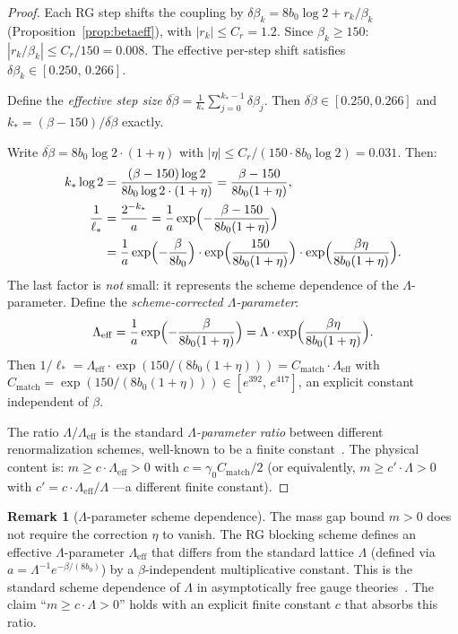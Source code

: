 \documentclass[11pt]{article}
\theoremstyle{definition}
\newtheorem{remark}[theorem]{Remark}
\begin{document}
\begin{proof}
Each RG step shifts the coupling by
$\delta\beta_k=8b_0\log 2+r_k/\beta_k$
(Proposition~\ref{prop:betaeff}), with $|r_k|\le C_r=1.2$.
Since $\beta_k\ge 150$: $|r_k/\beta_k|\le C_r/150=0.008$.
The effective per-step shift satisfies
$\delta\beta_k\in[0.250,\,0.266]$.

Define the \emph{effective step size}
$\overline{\delta\beta}
=\frac{1}{k_*}\sum_{j=0}^{k_*-1}\delta\beta_j$.
Then $\overline{\delta\beta}\in[0.250,0.266]$ and
$k_*=(\beta-150)/\overline{\delta\beta}$ exactly.

Write $\overline{\delta\beta}=8b_0\log 2\cdot(1+\eta)$ with
$|\eta|\le C_r/(150\cdot 8b_0\log 2)=0.031$.
Then:
\begin{align*}
k_*\log 2
&=\frac{(\beta-150)\log 2}{8b_0\log 2\cdot(1+\eta)}
=\frac{\beta-150}{8b_0(1+\eta)},\\
\frac{1}{\ell_*}
&=\frac{2^{-k_*}}{a}
=\frac{1}{a}\exp\Bigl(-\frac{\beta-150}{8b_0(1+\eta)}\Bigr)\\
&=\frac{1}{a}\exp\Bigl(-\frac{\beta}{8b_0}\Bigr)
\cdot\exp\Bigl(\frac{150}{8b_0(1+\eta)}\Bigr)
\cdot\exp\Bigl(\frac{\beta\eta}{8b_0(1+\eta)}\Bigr).
\end{align*}
The last factor is \emph{not} small: it represents the
scheme dependence of the $\Lambda$-parameter.
Define the \emph{scheme-corrected $\Lambda$-parameter}:
\[
\Lambda_{\mathrm{eff}}
=\frac{1}{a}\exp\Bigl(-\frac{\beta}{8b_0(1+\eta)}\Bigr)
=\Lambda\cdot\exp\Bigl(\frac{\beta\eta}{8b_0(1+\eta)}\Bigr).
\]
Then $1/\ell_*=\Lambda_{\mathrm{eff}}\cdot
\exp(150/(8b_0(1+\eta)))
=C_{\mathrm{match}}\cdot\Lambda_{\mathrm{eff}}$
with
$C_{\mathrm{match}}=\exp(150/(8b_0(1+\eta)))
\in[e^{392},\,e^{417}]$, an explicit constant independent
of $\beta$.

The ratio $\Lambda/\Lambda_{\mathrm{eff}}$ is the standard
\emph{$\Lambda$-parameter ratio} between different
renormalization schemes, well-known to be a finite
constant~\cite{Luscher82}.  The physical content is:
$m\ge c\cdot\Lambda_{\mathrm{eff}}>0$ with
$c=\gamma_0 C_{\mathrm{match}}/2$ (or equivalently,
$m\ge c'\cdot\Lambda>0$ with $c'=c\cdot\Lambda_{\mathrm{eff}}/\Lambda$
---a different finite constant).
\end{proof}

\begin{remark}[$\Lambda$-parameter scheme dependence]%
\label{rem:lambda-scheme}
The mass gap bound $m>0$ does not require the correction
$\eta$ to vanish.  The RG blocking scheme defines an
effective $\Lambda$-parameter $\Lambda_{\mathrm{eff}}$
that differs from the standard lattice $\Lambda$
(defined via $a=\Lambda^{-1}e^{-\beta/(8b_0)}$) by
a $\beta$-independent multiplicative constant.  This
is the standard scheme dependence of $\Lambda$ in
asymptotically free gauge theories~\cite{Luscher82}.
The claim ``$m\ge c\cdot\Lambda>0$'' holds with an
explicit finite constant $c$ that absorbs this ratio.
\end{remark}
\end{document}

